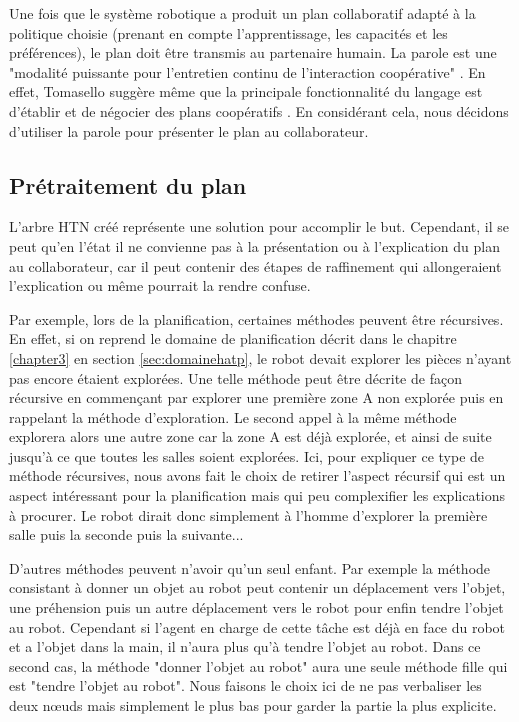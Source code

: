 \documentclass[a4paper,11pt,twoside]{StyleThese}
\begin{document}
Une fois que le système robotique a produit un plan collaboratif adapté à la politique choisie (prenant en compte l'apprentissage, les capacités et les préférences), le plan doit être transmis au partenaire humain.
La parole est une "modalité puissante pour l'entretien continu de l'interaction coopérative" \cite{Lallee2013}. En effet, Tomasello suggère même que la principale fonctionnalité du langage est d'établir et de négocier des plans coopératifs \cite{tomasello2005}.
En considérant cela, nous décidons d'utiliser la parole pour présenter le plan au collaborateur.

\subsection{Prétraitement du plan}

L'arbre HTN créé représente une solution pour accomplir le but. Cependant, il se peut qu'en l'état il ne convienne pas à la présentation ou à l'explication du plan au collaborateur, car il peut contenir des étapes de raffinement qui allongeraient l'explication ou même pourrait la rendre confuse.

Par exemple, lors de la planification, certaines méthodes peuvent être récursives. En effet, si on reprend le domaine de planification décrit dans le chapitre \ref{chapter3} en section \ref{sec:domainehatp}, le robot devait explorer les pièces n'ayant pas encore étaient explorées. Une telle méthode peut être décrite de façon récursive en commençant par explorer une première zone A non explorée puis en rappelant la méthode d'exploration. Le second appel à la même méthode explorera alors une autre zone car la zone A est déjà explorée, et ainsi de suite jusqu'à ce que toutes les salles soient explorées. 
Ici, pour expliquer ce type de méthode récursives, nous avons fait le choix de retirer l'aspect récursif qui est un aspect intéressant pour la planification mais qui peu complexifier les explications à procurer. Le robot dirait donc simplement à l'homme d'explorer la première salle puis la seconde puis la suivante...

D'autres méthodes peuvent n'avoir qu'un seul enfant. Par exemple la méthode consistant à donner un objet au robot peut contenir un déplacement vers l'objet, une préhension puis un autre déplacement vers le robot pour enfin tendre l'objet au robot. Cependant si l'agent en charge de cette tâche est déjà en face du robot et a l'objet dans la main, il n'aura plus qu'à tendre l'objet au robot. Dans ce second cas, la méthode "donner l'objet au robot" aura une seule méthode fille qui est "tendre l'objet au robot". Nous faisons le choix ici de ne pas verbaliser les deux nœuds mais simplement le plus bas pour garder la partie la plus explicite.
\end{document}
